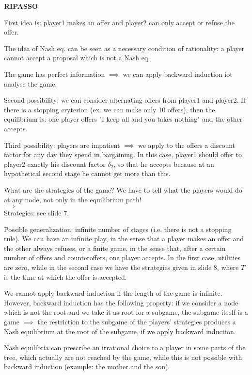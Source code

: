 \documentclass[pt11,a4paper,twoside,reqno,openright]{paper}
\begin{document}

\bigskip
\noindent \textbf{RIPASSO}

\noindent First idea is: player1 makes an offer and player2 can only accept or 
refuse the offer.

\noindent The idea of Nash eq. can be seen as a necessary condition of 
rationality: a player cannot accept a proposal which is not a Nash eq.

\noindent The game has perfect information $\implies$ we can apply backward 
induction iot analyse the game.

\noindent Second possibility: we can consider alternating offers from player1 
and player2. If there is a stopping cryterion (ex. we can make only 10 offers), 
then the equilibrium is: one player offers "I keep all and you takes nothing" 
and the other accepts.

\noindent Third possibility: players are impatient $\implies$ we apply to the 
offers a discount factor for any day they spend in bargaining. In this case, 
player1 should offer to player2 exactly his discount factor $\delta_2$, so that 
he accepts because at an hypothetical second stage he cannot get more than this.

\noindent What are the strategies of the game? We have to tell what the players 
would do at any node, not only in the equilibrium path!\\
$\implies$\\
Strategies: see slide 7.

\noindent Possible generalization: infinite number of stages (i.e. there is not 
a stopping rule). We can have an infinite play, in the sense that a player makes 
an offer and the other always refuses, or a finite game, in the sense that, 
after a certain number of offers and counteroffers, one player accepts. In 
the first case, utilities are zero, while in the second case we have the 
strategies given in slide 8, where $T$ is the time at which the offer is 
accepted.

\noindent We cannot apply backward induction if the length of the game is 
infinite. However, backward induction has the following property: if we 
consider a node which is not the root and we take it as root for a subgame, 
the subgame itself is a game $\implies$ the restriction to the subgame of the 
players' strategies produces a Nash equilibrium at the root of the subgame, if 
we apply backward induction.

\noindent Nash equilibria can prescribe an irrational choice to a player in 
some parts of the tree, which actually are not reached by the game, while 
this is not possible with backward induction (example: the mother and the son).
\end{document}

